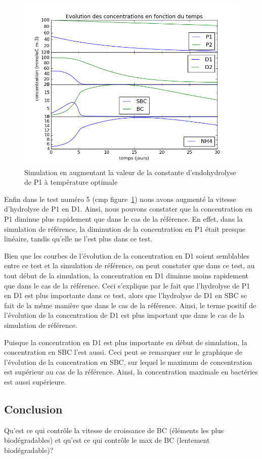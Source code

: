 \begin{figure}[h!]
  \includegraphics[width=\textwidth]{partie2/Test5.png}
  \caption{Simulation en augmentant la valeur de la constante d'endohydrolyse de P1 \`a temp\'erature optimale
  }
  \label{fig:partie2test5}
\end{figure}

\par{
Enfin dans le test numéro 5 (cmp figure~\ref{fig:partie2test5})
nous avons augment\'e la vitesse d'hydrolyse de P1 en D1. Ainsi, nous pouvons constater que la concentration en P1 diminue plus rapidement que dans le cas de la r\'ef\'erence. En effet, dans la simulation de r\'ef\'erence, la diminution de la concentration en P1 \'etait presque lin\'eaire, tandis qu'elle ne l'est plus dans ce test.
}
\par{
Bien que les courbes de l'\'evolution de la concentration en D1 soient semblables entre ce test et la simulation de r\'ef\'erence, on peut constater que dans ce test, au tout d\'ebut de la simulation, la concentration en D1 diminue moins rapidement que dans le cas de la r\'ef\'erence. Ceci s'explique par le fait que l'hydrolyse de P1 en D1 est plus importante dans ce test, alors que l'hydrolyse de D1 en SBC se fait de la m\^eme mani\`ere que dans le cas de la r\'ef\'erence. Ainsi, le terme positif de l'\'evolution de la concentration de D1 est plus important que dans le cas de la simulation de r\'ef\'erence.
}
\par{
Puisque la concentration en D1 est plus importante en d\'ebut de simulation, la concentration en SBC l'est aussi. Ceci peut se remarquer sur le graphique de l'\'evolution de la concentration en SBC, sur lequel le maximum de concentration est sup\'erieur au cas de la r\'ef\'erence. Ainsi, la concentration maximale en bact\'eries est aussi sup\'erieure.
}
 
\FloatBarrier
\subsection{Conclusion}
\par{
Qu'est ce qui contr\^ole la vitesse de croissance de BC (\'el\'ements les plus biod\'egradables) et qu'est ce qui contr\^ole le max de BC (lentement biod\'egradable)?
}
\par{
\todo
}
